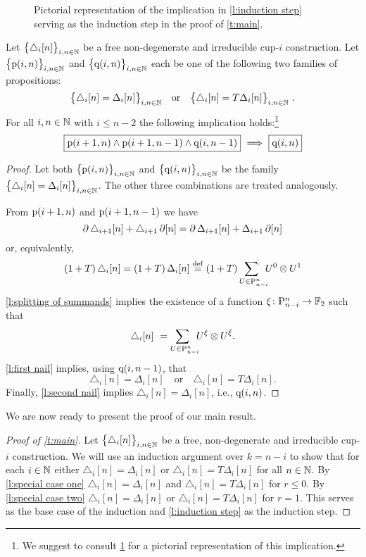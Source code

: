 \begin{figure}
	\centering
	
	\caption{Pictorial representation of the implication in \cref{l:induction step} serving as the induction step in the proof of \cref{t:main}.}
	\label{f:induction step}
\end{figure}

\begin{lemma} \label{l:induction step}
	Let $\big\{ \triangle_i [n] \big\}_{i,n\in\mathbb{N}}$ be a free non-degenerate and irreducible cup-$i$ construction.
	Let $\big\{ \mathrm{p}(i,n) \big\}_{i,n \in \mathbb{N}}$ and $\big\{ \mathrm{q}(i,n) \big\}_{i,n \in \mathbb{N}}$ each be one of the following two families of propositions:
	\[
	\big\{ \triangle_i [n] = \Delta_ i [n] \big\}_{i,n\in\N}
	\quad \text{or} \quad
	\big\{ \triangle_i [n] = T \Delta_ i [n] \big\}_{i,n\in\N} \ .
	\]
	For all $i,n \in \mathbb{N}$ with $i \leq n-2$ the following implication holds:\footnote{We suggest to consult \cref{f:induction step} for a pictorial representation of this implication.}
	\[
	\boxed{\mathrm{p}(i+1,n) \wedge \mathrm{p}(i+1,n-1) \wedge \mathrm{q}(i,n-1)}\ \Longrightarrow\ \boxed{\mathrm{q}(i,n)}
	\]
\end{lemma}

\begin{proof}
	Let both $\big\{ \mathrm{p}(i,n) \big\}_{i,n\in\mathbb{N}}$ and $\big\{ \mathrm{q}(i,n) \big\}_{i,n\in\mathbb{N}}$ be the family $\big\{ \triangle_i [n] = \Delta_i [n] \big\}_{i,n \in \mathbb{N}}$.
	The other three combinations are treated analogously.

	From $\mathrm{p}(i+1,n)$ and $\mathrm{p}(i+1,n-1)$ we have
	\[
	\operatorname{\partial} \triangle_{i+1} [n] + \triangle_{i+1} \operatorname{\partial} [n] = \operatorname{\partial} \Delta_{i+1} [n] + \Delta_{i+1} \operatorname{\partial} [n]
	\]
	or, equivalently,
	\begin{align*}
	(1+T) \, \triangle_i [n] =
	(1+T) \, \Delta_i [n] \stackrel{\mathrm{def}}{=}
	(1+T) \sum_{U \in \mathrm{P}_{n-i}^n \kern-5pt} {U^0} \otimes {U^1}
	\end{align*}
	\cref{l:splitting of summands} implies the existence of a function $\xi \colon \mathrm{P}_{n-i}^n \to {\mathbb{F}_2}$ such that
	\[
	\triangle_i [n] \ =
	\sum_{U \in \mathrm{P}_{n-i}^n \kern-5pt} U^\xi \otimes U^{\bar{\xi}}.
	\]
	\cref{l:first nail} implies, using $\mathrm{q}(i,n-1)$, that
	\[
	\triangle_i [n] = \Delta_i [n]
	\quad \text{or} \quad
	\triangle_i [n] = T \Delta_i [n].
	\]
	Finally, \cref{l:second nail} implies $\triangle_i [n] = \Delta_i [n]$, i.e., $\mathrm{q}(i,n)$.
\end{proof}

We are now ready to present the proof of our main result.

\begin{proof}[Proof of \cref{t:main}]
	Let $\big\{ \triangle_i [n] \big\}_{i,n\in\mathbb{N}}$ be a free, non-degenerate and irreducible cup-$i$ construction.
	We will use an induction argument over $k = n-i$ to show that for each $i \in \mathbb{N}$ either $\triangle_i [n] = \Delta_i [n]$ or
	$\triangle_i [n] = T \Delta_i [n]$ for all $n \in \mathbb{N}$.
	By \cref{l:special case one} $\triangle_i [n] = \Delta_i [n]$ and $\triangle_i [n] = T \Delta_i [n]$ for $r \leq 0$.
	By \cref{l:special case two} $\triangle_i [n] = \Delta_i [n]$ or $\triangle_i [n] = T \Delta_i [n]$ for $r = 1$.
	This serves as the base case of the induction and \cref{l:induction step} as the induction step.
\end{proof}